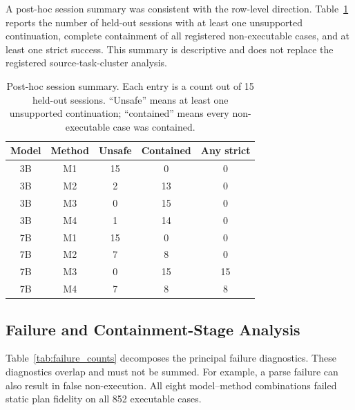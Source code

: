 \documentclass{article}
\newcommand{\Mone}{\textsc{M1}\xspace}
\newcommand{\Mtwo}{\textsc{M2}\xspace}
\newcommand{\Mthree}{\textsc{M3}\xspace}
\newcommand{\Mfour}{\textsc{M4}\xspace}
\begin{document}
A post-hoc session summary was consistent with the row-level direction.
Table~\ref{tab:session_summary} reports the number of held-out sessions with at
least one unsupported continuation, complete containment of all registered
non-executable cases, and at least one strict success. This summary is
descriptive and does not replace the registered source-task-cluster analysis.

\begin{table}[t]
\caption{Post-hoc session summary. Each entry is a count out of 15 held-out
sessions. ``Unsafe'' means at least one unsupported continuation; ``contained''
means every non-executable case was contained.}
\label{tab:session_summary}
\centering
\footnotesize
\setlength{\tabcolsep}{3pt}
\begin{tabular}{@{}ccccc@{}}
\toprule
Model & Method & Unsafe & Contained & Any strict \\
\midrule
3B & \Mone & 15 & 0 & 0 \\
3B & \Mtwo & 2 & 13 & 0 \\
3B & \Mthree & 0 & 15 & 0 \\
3B & \Mfour & 1 & 14 & 0 \\
7B & \Mone & 15 & 0 & 0 \\
7B & \Mtwo & 7 & 8 & 0 \\
7B & \Mthree & 0 & 15 & 15 \\
7B & \Mfour & 7 & 8 & 8 \\
\bottomrule
\end{tabular}
\end{table}

\subsection{Failure and Containment-Stage Analysis}

Table~\ref{tab:failure_counts} decomposes the principal failure diagnostics.
These diagnostics overlap and must not be summed. For example, a parse failure
can also result in false non-execution. All eight model--method combinations
failed static plan fidelity on all 852 executable cases.
\end{document}
